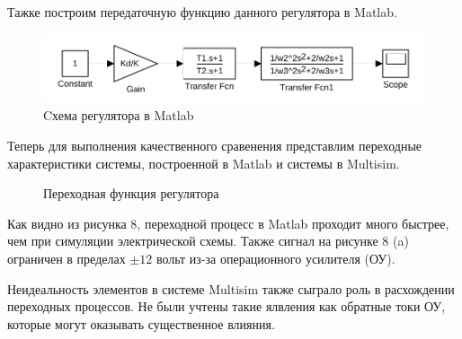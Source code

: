 \documentclass[russian, utf8]{eskdtext}
\begin{document}
\newpage

Тажке построим передаточную функцию данного регулятора в Matlab.
\begin{figure}[h!]
    \centering
    \includegraphics{images/regulator.pdf}
    \caption{Cхема регулятора в Matlab}
\end{figure}

Теперь для выполнения качественного сравенения представлим переходные характеристики системы, построенной в Matlab и системы в Multisim.

\begin{figure}[h!]
    \centering
    \caption{Переходная функция регулятора}
\end{figure}

Как видно из рисунка 8, переходной процесс в Matlab проходит много быстрее, чем при симуляции электрической схемы. Также сигнал на рисунке 8 (a) ограничен в пределах $\pm 12$ вольт из-за операционного усилителя (ОУ).\par
Неидеальность элементов в системе Multisim также сыграло роль в расхождении переходных процессов. Не были учтены такие ялвления как обратные токи ОУ, которые могут оказывать существенное влияния.
\end{document}
